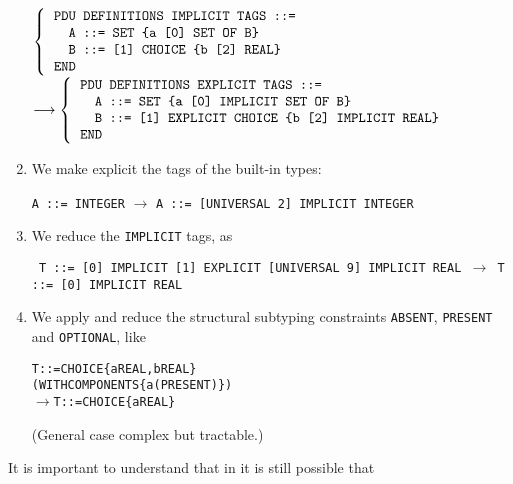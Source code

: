 \begin{enumerate}
  \begin{center}
   {\small
    $\left\{
     \begin{tabular}{l}
       \verb+PDU DEFINITIONS IMPLICIT TAGS ::=+\\
       \verb+  A ::= SET {a [0] SET OF B}+\\
       \verb+  B ::= [1] CHOICE {b [2] REAL}+\\
       \verb+END+
     \end{tabular}
     \right.$
    $\longrightarrow
     \left\{ 
     \begin{tabular}{l}
       \verb+PDU DEFINITIONS EXPLICIT TAGS ::=+\\
       \verb+  A ::= SET {a [0] IMPLICIT SET OF B}+\\
       \verb+  B ::= [1] EXPLICIT CHOICE {b [2] IMPLICIT REAL}+\\
       \verb+END+
     \end{tabular}
     \right.$
   }
  \end{center}

  \item We make explicit the tags of the built-in types:
   \begin{center}
    {\small 
     \verb+A ::= INTEGER+ $\longrightarrow$
     \verb+A ::= [UNIVERSAL 2] IMPLICIT INTEGER+
    }
   \end{center}

  \item We reduce the \texttt{\small IMPLICIT} tags, as
   \begin{center}
    \small\tt
    T ::= [0] IMPLICIT [1] EXPLICIT [UNIVERSAL 9] IMPLICIT REAL
    $\longrightarrow$ T ::= [0] IMPLICIT REAL
   \end{center}
   
  \item \label{structural_constraints} We apply and reduce the
  structural subtyping constraints \texttt{\small ABSENT},
  \texttt{\small PRESENT} and \texttt{\small OPTIONAL}, like
  \begin{alltt}
  \small
T ::= CHOICE \{a REAL, b REAL\}
             (WITH COMPONENTS \{a(PRESENT)\})
  \(\longrightarrow\) T ::= CHOICE \{a REAL\}
  \end{alltt}
  (General case complex but tractable.)

\end{enumerate}

\medskip

It is important to understand that in \core it is still possible that

